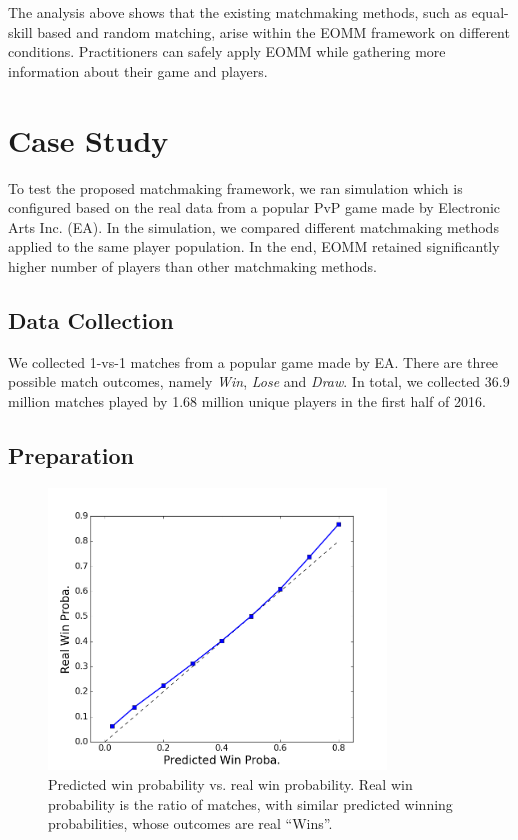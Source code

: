 The analysis above shows that the existing matchmaking methods, such as equal-skill based and random matching, arise within the EOMM framework on different conditions. Practitioners can safely apply EOMM while gathering more information about their game and players.

\section{Case Study}\label{sec:casestudy}
To test the proposed matchmaking framework, we ran simulation which is configured based on the real data from a popular PvP game made by Electronic Arts Inc.\! (EA). In the simulation, we compared different matchmaking methods applied to the same player population. In the end, EOMM retained significantly higher number of players than other matchmaking methods.

\subsection{Data Collection}
We collected 1-vs-1 matches from a popular game made by EA. There are three possible match outcomes, namely \emph{Win}, \emph{Lose} and \emph{Draw}. In total, we collected 36.9 million matches played by 1.68 million unique players in the first half of 2016.

\subsection{Preparation}\label{sec:preprosessing}

\begin{figure}[t]
\centering
\includegraphics[width=0.8\textwidth]{Figures/prob_calib_glicko_line.png}
\caption{Predicted win probability vs. real win probability. Real win probability is the ratio of matches, with similar predicted winning probabilities, whose outcomes are real ``Wins''.  }
\label{fig:glicko_cali}
\end{figure}


